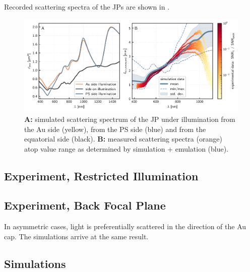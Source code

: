\documentclass[10pt]{article}
\newcommand{\reffig}[2]{\mbox{\sffamily{Figure \ref{#1}#2}}}
\begin{document}
\begin{multicols}{2}
Recorded scattering spectra of the JPs are shown in \reffig{fig:spectra}{B}.

\begin{figure}[t]
    \centering
    \includegraphics{[fig] spectra.PDF}
    \caption{{\sffamily\bfseries A:} simulated scattering spectrum of the JP under illumination from the Au side (yellow), from the PS side (blue) and from the equatorial side (black). {\sffamily\bfseries B:} measured scattering spectra (orange) atop value range as determined by simulation + emulation (blue).}
    \label{fig:spectra}
\end{figure}


\subsection*{Experiment, Restricted Illumination}






\subsection*{Experiment, Back Focal Plane}


In asymmetric cases, light is preferentially scattered in the direction of the Au cap. 
The simulations arrive at the same result. 




\subsection*{Simulations}


\end{multicols}
\end{document}
